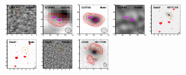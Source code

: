 \documentclass[iop]{emulateapj}
\begin{document}
\begin{figure}[!tbp]
\begin{centering}
\includegraphics[width=0.162\textwidth]{../Figures/modelfit/CDFS_M1_residual_bestfit.pdf}
\includegraphics[width=0.162\textwidth]{../Figures/modelfit/ECDFS02_optical_bestfit.pdf}
\includegraphics[width=0.162\textwidth]{../Figures/modelfit/ECDFS02_model_bestfit.pdf}
\includegraphics[width=0.162\textwidth]{../Figures/modelfit/ECDFS02_residual_bestfit.pdf}
\includegraphics[width=0.162\textwidth]{../Figures/modelfit/ElaisS1_optical_bestfit.pdf}
\includegraphics[width=0.162\textwidth]{../Figures/modelfit/ElaisS1_model_bestfit.pdf}
\includegraphics[width=0.162\textwidth]{../Figures/modelfit/ElaisS1_residual_bestfit.pdf}
\includegraphics[width=0.162\textwidth]{../Figures/modelfit/COS01_optical_bestfit.pdf}

\end{centering}
\end{figure}
\end{document}
